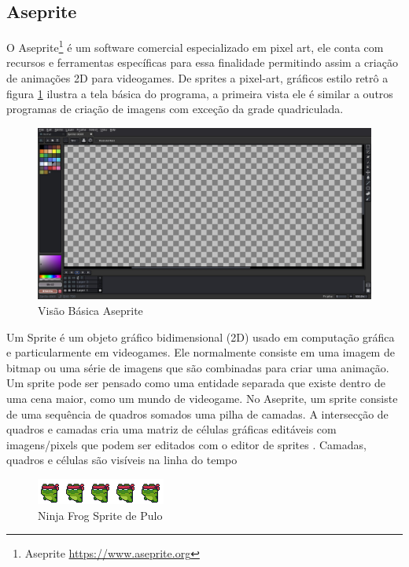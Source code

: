 \newpage
\subsection{Aseprite}  
O Aseprite\footnote{Aseprite \url{https://www.aseprite.org}} é um software comercial especializado em pixel art, ele conta com recursos e ferramentas específicas para essa finalidade permitindo assim a criação de animações 2D para videogames. De sprites a pixel-art, gráficos estilo retrô a figura \ref{fig:aseprite} ilustra a tela básica do programa, a primeira vista ele é similar a outros programas de criação de imagens com exceção da grade quadriculada.  
\begin{figure}[ht!]
    \centering
    \includegraphics[width=1\linewidth]{figuras/aseprite.jpg}
    \caption{Visão Básica Aseprite}
    \label{fig:aseprite}
\end{figure}

Um Sprite é um objeto gráfico bidimensional (2D) usado em computação gráfica e particularmente em videogames. Ele normalmente consiste em uma imagem de bitmap ou uma série de imagens que são combinadas para criar uma animação. Um sprite pode ser pensado como uma entidade separada que existe dentro de uma cena maior, como um mundo de videogame. No Aseprite, um sprite consiste de uma sequência de quadros somados uma pilha de camadas. A intersecção de quadros e camadas cria uma matriz de células gráficas editáveis com imagens/pixels que podem ser editados com o editor de sprites . Camadas, quadros e células são visíveis na linha do tempo
\begin{figure}[h!]
    \centering
    \includegraphics[width=1\linewidth]{figuras/sprite-frog.png}
    \caption{Ninja Frog Sprite de Pulo}
    \label{fig:enter-label}
\end{figure}
